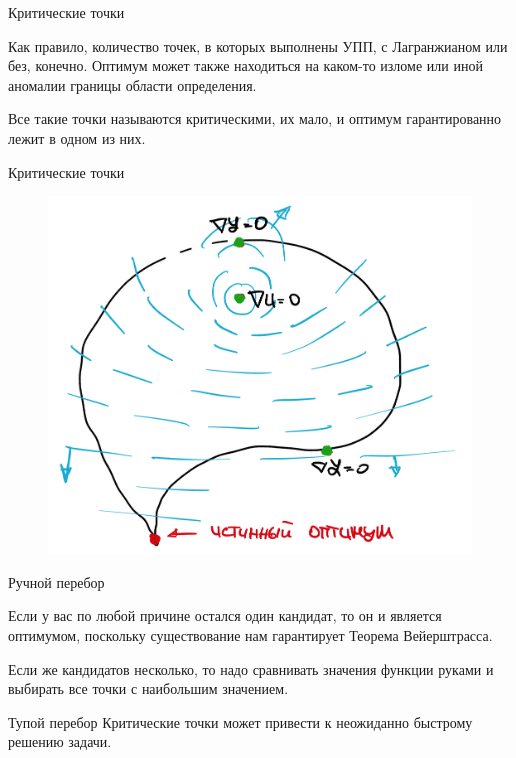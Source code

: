 \documentclass{beamer}
\begin{document}
\begin{frame}{Критические точки}

Как правило, количество точек, в которых выполнены УПП, с Лагранжианом или без,  конечно. Оптимум может также находиться на каком-то изломе или иной аномалии границы области определения.

Все такие точки называются \alert{критическими}, их мало, и оптимум гарантированно лежит в одном из них. 

\end{frame}

\begin{frame}{Критические точки}

\begin{figure}[hbt]
\centering
\includegraphics[width=.8 \textwidth]{extrema.png}
\end{figure}

\end{frame}

\begin{frame}{Ручной перебор}

Если у вас по любой причине остался один кандидат, то он и является оптимумом, поскольку существование нам гарантирует Теорема Вейерштрасса. 

Если же кандидатов несколько, то надо сравнивать значения функции руками и выбирать все точки с наибольшим значением. 

Тупой перебор Критические точки может привести к неожиданно быстрому решению задачи.

\end{frame}
\end{document}
